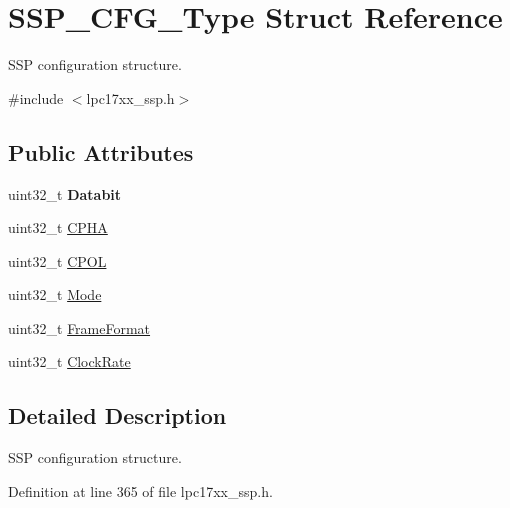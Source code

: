 \hypertarget{struct_s_s_p___c_f_g___type}{\section{\-S\-S\-P\-\_\-\-C\-F\-G\-\_\-\-Type \-Struct \-Reference}
\label{struct_s_s_p___c_f_g___type}
}


\-S\-S\-P configuration structure.  




{\ttfamily \#include $<$lpc17xx\-\_\-ssp.\-h$>$}

\subsection*{\-Public \-Attributes}
\begin{DoxyCompactItemize}
\item 
\hypertarget{struct_s_s_p___c_f_g___type_a7b8cea10875f517ef0af31f82bd1c51a}{uint32\-\_\-t {\bfseries \-Databit}}\label{struct_s_s_p___c_f_g___type_a7b8cea10875f517ef0af31f82bd1c51a}

\item 
uint32\-\_\-t \hyperlink{struct_s_s_p___c_f_g___type_af34662ac679b1c7329ed644a749dd2da}{\-C\-P\-H\-A}
\item 
uint32\-\_\-t \hyperlink{struct_s_s_p___c_f_g___type_ac808d0a31a64e1e8ba7a83029cdf7241}{\-C\-P\-O\-L}
\item 
uint32\-\_\-t \hyperlink{struct_s_s_p___c_f_g___type_a1d6f2a353259308dd2f289b88a59742a}{\-Mode}
\item 
uint32\-\_\-t \hyperlink{struct_s_s_p___c_f_g___type_acaeda2f05cde2ca11a630a953bbfe852}{\-Frame\-Format}
\item 
uint32\-\_\-t \hyperlink{struct_s_s_p___c_f_g___type_a00f744e032746b5b107556a9d7094c4a}{\-Clock\-Rate}
\end{DoxyCompactItemize}


\subsection{\-Detailed \-Description}
\-S\-S\-P configuration structure. 

\-Definition at line 365 of file lpc17xx\-\_\-ssp.\-h.



